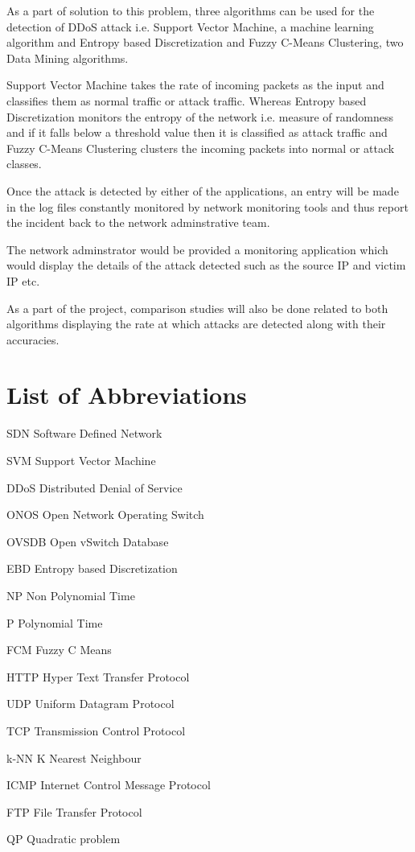 \documentclass[12pt,a4paper,final]{report}
\newcommand{\abbrlabel}[1]{\makebox[6cm][l]{\textbf{#1}\ \dotfill}}
\newenvironment{abbreviations}{\begin{list}{}{\renewcommand{\makelabel}{\abbrlabel}}}{\end{list}}
\begin{document}
As a part of solution to this problem, three algorithms can be used for the detection of DDoS attack i.e. Support Vector Machine, a machine learning algorithm and Entropy based Discretization and Fuzzy C-Means Clustering, two Data Mining algorithms.

Support Vector Machine takes the rate of incoming packets as the input and classifies them as normal traffic or attack traffic. Whereas Entropy based Discretization monitors the entropy of the network i.e. measure of randomness and if it falls below a threshold value then it is classified as attack traffic and Fuzzy C-Means Clustering clusters the incoming packets into normal or attack classes.

Once the attack is detected by either of the applications, an entry will be made in the log files constantly monitored by network monitoring tools and thus report the incident back to the network adminstrative team.

The network adminstrator would be provided a monitoring application which would display the details of the attack detected such as the source IP and victim IP etc.

As a part of the project, comparison studies will also be done related to both algorithms displaying the rate at which attacks are detected along with their accuracies.
\newpage

\listoffigures
{}
\newpage
\listoftables
{}
\newpage

\chapter*{\centering List of Abbreviations}
\begin{abbreviations}
\item[SDN] Software Defined Network
\item[SVM] Support Vector Machine
\item[DDoS] Distributed Denial of Service
\item[ONOS] Open Network Operating Switch
\item[OVSDB] Open vSwitch Database
\item[EBD] Entropy based Discretization
\item[NP] Non Polynomial Time
\item[P] Polynomial Time
\item[FCM] Fuzzy C Means 
\item[HTTP] Hyper Text Transfer Protocol
\item[UDP] Uniform Datagram Protocol
\item[TCP] Transmission Control Protocol
\item[k-NN] K Nearest Neighbour
\item[ICMP] Internet Control Message Protocol
\item[FTP] File Transfer Protocol
\item[QP] Quadratic problem
\end{abbreviations}
\end{document}
